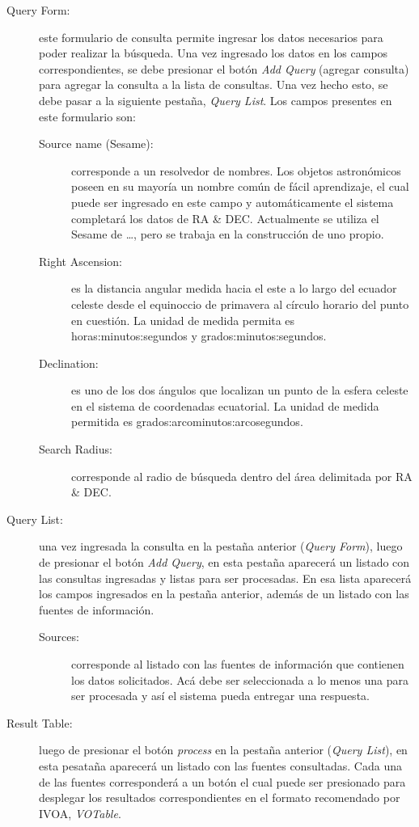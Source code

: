 \begin{description}
  \item [Query Form:] este formulario de consulta permite ingresar los
    datos necesarios para poder realizar la búsqueda. Una vez
    ingresado los datos en los campos correspondientes, se debe
    presionar el botón \emph{Add Query} (agregar consulta) para
    agregar la consulta a la lista de consultas. Una vez hecho esto,
    se debe pasar a la siguiente pestaña, \emph{Query List}. Los
    campos presentes en este formulario son:
    \begin{description}
      \item [Source name (Sesame):] corresponde a un resolvedor de
	nombres. Los objetos astronómicos poseen en su mayoría un
	nombre común de fácil aprendizaje, el cual puede ser ingresado
	en este campo y automáticamente el sistema completará los
	datos de RA \& DEC. Actualmente se utiliza el Sesame de
	{\ldots}, pero se trabaja en la construcción de uno propio.
      \item [Right Ascension:] es la distancia angular medida hacia el
	este a lo largo del ecuador celeste desde el equinoccio de
	primavera al círculo horario del punto en cuestión. La unidad
	de medida permita es horas:minutos:segundos y grados:minutos:segundos.
      \item [Declination:] es uno de los dos ángulos que localizan un
	punto de la esfera celeste en el sistema de coordenadas
	ecuatorial. La unidad de medida permitida es
	grados:arcominutos:arcosegundos.
      \item [Search Radius:] corresponde al radio de búsqueda dentro
	del área delimitada por RA \& DEC.
    \end{description}
  \item [Query List:] una vez ingresada la consulta en la pestaña
    anterior (\emph{Query Form}), luego de presionar el botón
    \emph{Add Query}, en esta pestaña aparecerá un listado con las
    consultas ingresadas y listas para ser procesadas. En esa lista
    aparecerá los campos ingresados en la pestaña anterior, además de
    un listado con las fuentes de información.
    \begin{description}
      \item [Sources:] corresponde al listado con las fuentes de
	información que contienen los datos solicitados. Acá debe ser
	seleccionada a lo menos una para ser procesada y así el
	sistema pueda entregar una respuesta.
    \end{description}
  \item [Result Table:] luego de presionar el botón \emph{process} en
    la pestaña anterior (\emph{Query List}), en esta pesataña
    aparecerá un listado con las fuentes consultadas. Cada una de las
    fuentes corresponderá a un botón el cual puede ser presionado para
    desplegar los resultados correspondientes en el formato
    recomendado por IVOA, \emph{VOTable}.
\end{description}  


